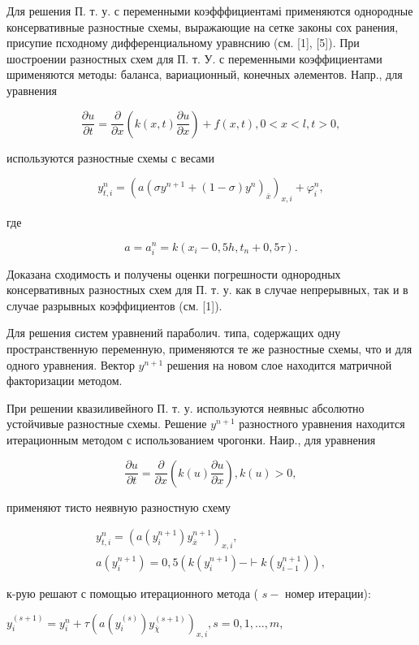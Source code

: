 \documentclass[10pt]{article}
\begin{document}
Для решения П. т. у. с переменными коэфффициентамі применяются однородные консервативные разностные схемы, выражающие на сетке законы сох ранения, присупие псходному дифференциальному уравнснию (см. [1], [5]). При шостроении разностных схем для П. т. У. с переменными коэффициентами шрименяются методы: баланса, вариационный, конечных әлементов. Напр., для уравнения

\[
\frac{\partial u}{\partial t}=\frac{\partial}{\partial x}\left(k(x, t) \frac{\partial u}{\partial x}\right)+f(x, t), 0<x<l, t>0,
\]

используются разностные схемы с весами

\[
y_{t, i}^{n}=\left(a\left(\sigma y^{n+1}+(1-\sigma) y^{n}\right)_{\bar{x}}\right)_{x, i}+\varphi_{i}^{n},
\]

где

\[
a=a_{i}^{n}=k\left(x_{i}-0,5 h, t_{n}+0,5 \tau\right) .
\]

Доказана сходимость и получены оценки погрешности однородных консервативных разностных схем для П. т. у. как в случае непрерывных, так и в случае разрывных коэффициентов (см. [1]).

Для решения систем уравнений параболич. типа, содержащих одну пространственную переменную, применяются те же разностные схемы, что и для одного уравнения. Вектор $y^{n+1}$ решения на новом слое находится матричной факторизации методом.

При решении квазиливейного П. т. у. используются неявныс абсолютно устойчивые разностные схемы. Решение $y^{n+1}$ разностного уравнения находится итерационным методом с использованием чрогонки. Наир., для уравнения

\[
\frac{\partial u}{\partial t}=\frac{\partial}{\partial x}\left(k(u) \frac{\partial u}{\partial x}\right), k(u)>0,
\]

применяют тисто неявную разностную схему

\[
\begin{gathered}
y_{t, i}^{n}=\left(a\left(y_{i}^{n+1}\right) y_{\bar{x}}^{n+1}\right)_{x, i}, \\
a\left(y_{i}^{n+1}\right)=0,5\left(k\left(y_{i}^{n+1}\right)-\vdash k\left(y_{i-1}^{n+1}\right)\right),
\end{gathered}
\]

к-рую решают с помощью итерационного метода ( $s-$ номер итерации):

$y_{i}^{(s+1)}=y_{i}^{n}+\tau\left(a\left(y_{i}^{(s)}\right) y_{\bar{\chi}}^{(s+1)}\right)_{x, i}, s=0,1, \ldots, m$,
\end{document}
